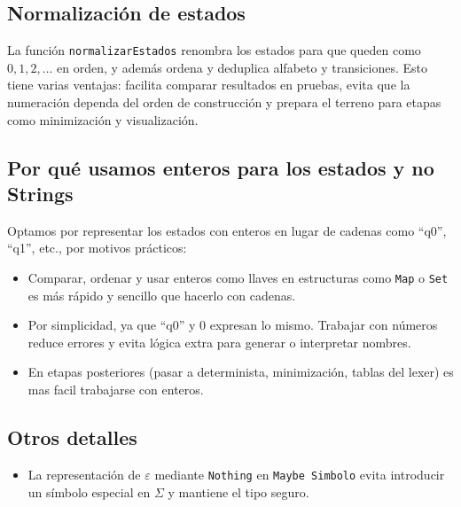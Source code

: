 \subsection{Normalización de estados}

La función \texttt{normalizarEstados} renombra los estados para que queden como \(0, 1, 2, \dots\) en orden, y además ordena y deduplica alfabeto y transiciones. Esto tiene varias ventajas: facilita comparar resultados en pruebas, evita que la numeración dependa del orden de construcción y prepara el terreno para etapas como minimización y visualización.

\subsection{Por qué usamos enteros para los estados y no Strings}

Optamos por representar los estados con enteros en lugar de cadenas como “q0”, “q1”, etc., por motivos prácticos:
\begin{itemize}
    \item Comparar, ordenar y usar enteros como llaves en estructuras como \texttt{Map} o \texttt{Set} es más rápido y sencillo que hacerlo con cadenas.
    \item Por simplicidad, ya que “q0” y \(0\) expresan lo mismo. Trabajar con números reduce errores y evita lógica extra para generar o interpretar nombres.
    \item En etapas posteriores (pasar a determinista, minimización, tablas del lexer) es mas facil trabajarse con enteros.
\end{itemize}

\subsection{Otros detalles}

\begin{itemize}
    \item La representación de $\varepsilon$ mediante \texttt{Nothing} en \texttt{Maybe Simbolo} evita introducir un símbolo especial en $\Sigma$ y mantiene el tipo seguro.
\end{itemize}
